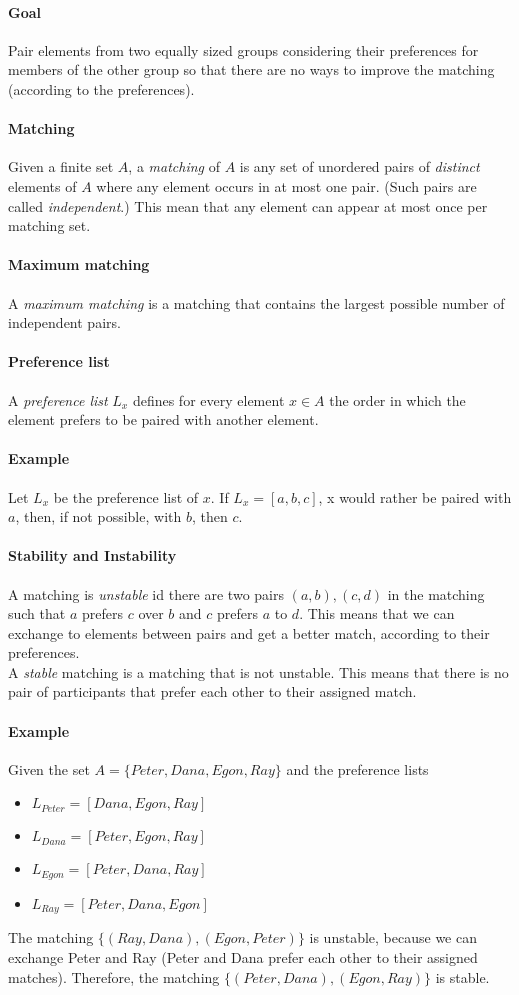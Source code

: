 \documentclass[10pt,a4paper]{book}
\begin{document}
\paragraph*{Goal}
Pair elements from two equally sized groups considering their preferences for members of the other group so that there are no ways to improve the matching (according to the preferences).
\paragraph*{Matching}
Given a finite set $A$, a \textit{matching} of $A$ is any set of unordered pairs of \textit{distinct} elements of $A$ where any element occurs in at most one pair. (Such pairs are called \textit{independent}.) This mean that any element can appear at most once per matching set.
\paragraph*{Maximum matching}
A \textit{maximum matching} is a matching that contains the largest possible number of independent pairs.
\paragraph*{Preference list}
A \textit{preference list} $L_x$ defines for every element $x \in A$ the order in which the element prefers to be paired with another element. 
\paragraph*{Example}
Let $L_x$ be the preference list of $x$. If $L_x = [a,b,c]$, x would rather be paired with $a$, then, if not possible, with $b$, then $c$.
\paragraph*{Stability and Instability}
A matching is \textit{unstable} id there are two pairs $(a,b),(c,d)$ in the matching such that $a$ prefers $c$ over $b$ and $c$ prefers $a$ to $d$. This means that we can exchange to elements between pairs and get a better match, according to their preferences.\\
A \textit{stable} matching is a matching that is not unstable. This means that there is no pair of participants that prefer each other to their assigned match. 
\paragraph*{Example}
Given the set $A = \{Peter, Dana, Egon, Ray\}$ and the preference lists
\begin{itemize}
\item $L_{Peter} = [Dana, Egon, Ray]$
\item $L_{Dana} = [Peter, Egon, Ray]$
\item $L_{Egon} = [Peter, Dana, Ray]$
\item $L_{Ray} = [Peter, Dana, Egon]$
\end{itemize}
The matching $\{(Ray, Dana), (Egon, Peter)\}$ is unstable, because we can exchange Peter and Ray (Peter and Dana prefer each other to their assigned matches). Therefore, the matching $\{(Peter, Dana), (Egon, Ray)\}$ is stable.
\end{document}
